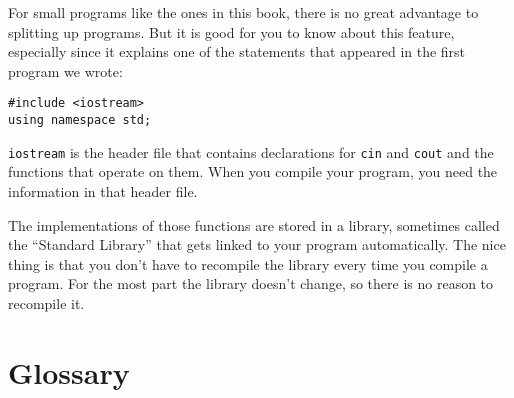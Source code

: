 For small programs like the ones in this book, there is
no great advantage to splitting up programs.  But it is good
for you to know about this feature, especially since it explains
one of the statements that appeared in the first program we
wrote:

\begin{verbatim}
#include <iostream>
using namespace std;
\end{verbatim}
%
{\tt iostream} is the header file that contains declarations
for {\tt cin} and {\tt cout} and the functions that operate on
them.  When you compile your program, you need the information
in that header file.

The implementations of those functions are stored in a library,
sometimes called the ``Standard Library'' that gets linked to
your program automatically.  The nice thing is that you don't
have to recompile the library every time you compile a program.
For the most part the library doesn't change, so there is no
reason to recompile it.

\section{Glossary}

